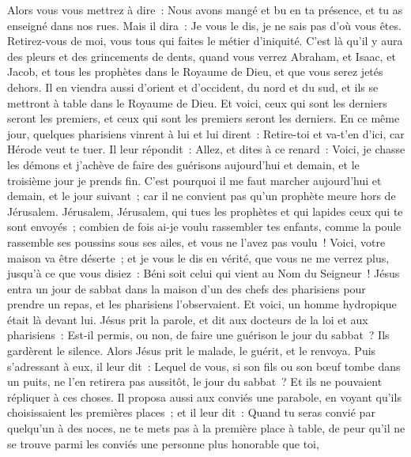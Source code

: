 \begin{multicols}{2}
Alors vous vous mettrez à dire~: Nous avons mangé et bu en ta présence, et tu as enseigné dans nos rues.
Mais il dira~: Je vous le dis, je ne sais pas d'où vous êtes. Retirez-vous de moi, vous tous qui faites le métier d'iniquité.
C'est là qu'il y aura des pleurs et des grincements de dents, quand vous verrez Abraham, et Isaac, et Jacob, et tous les prophètes dans le Royaume de Dieu, et que vous serez jetés dehors.
Il en viendra aussi d'orient et d'occident, du nord et du sud, et ils se mettront à table dans le Royaume de Dieu.
Et voici, ceux qui sont les derniers seront les premiers, et ceux qui sont les premiers seront les derniers.
En ce même jour, quelques pharisiens vinrent à lui et lui dirent~: Retire-toi et va-t'en d'ici, car Hérode veut te tuer.
Il leur répondit~: Allez, et dites à ce renard~: Voici, je chasse les démons et j'achève de faire des guérisons aujourd'hui et demain, et le troisième jour je prends fin.
C'est pourquoi il me faut marcher aujourd'hui et demain, et le jour suivant~; car il ne convient pas qu'un prophète meure hors de Jérusalem.
Jérusalem, Jérusalem, qui tues les prophètes et qui lapides ceux qui te sont envoyés~; combien de fois ai-je voulu rassembler tes enfants, comme la poule rassemble ses poussins sous ses ailes, et vous ne l'avez pas voulu~!
Voici, votre maison va être déserte~; et je vous le dis en vérité, que vous ne me verrez plus, jusqu'à ce que vous disiez~: Béni soit celui qui vient au Nom du Seigneur~!
\VerseOne{}Jésus entra un jour de sabbat dans la maison d'un des chefs des pharisiens pour prendre un repas, et les pharisiens l'observaient.
Et voici, un homme hydropique était là devant lui.
Jésus prit la parole, et dit aux docteurs de la loi et aux pharisiens~: Est-il permis, ou non, de faire une guérison le jour du sabbat~?
Ils gardèrent le silence. Alors Jésus prit le malade, le guérit, et le renvoya.
Puis s'adressant à eux, il leur dit~: Lequel de vous, si son fils ou son bœuf tombe dans un puits, ne l'en retirera pas aussitôt, le jour du sabbat~?
Et ils ne pouvaient répliquer à ces choses.
Il proposa aussi aux conviés une parabole, en voyant qu'ils choisissaient les premières places~; et il leur dit~:
Quand tu seras convié par quelqu'un à des noces, ne te mets pas à la première place à table, de peur qu'il ne se trouve parmi les conviés une personne plus honorable que toi,

\end{multicols}

